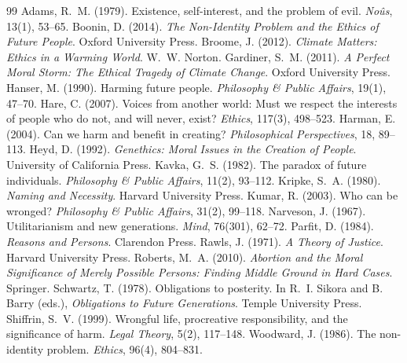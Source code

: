 \documentclass{situationist-preprint}
\begin{document}
\begin{thebibliography}{99}\small
{} Adams, R.~M. (1979). Existence, self-interest, and the problem of evil. \emph{No{\^u}s}, 13(1), 53--65.
 Boonin, D. (2014). \emph{The Non-Identity Problem and the Ethics of Future People}. Oxford University Press.
 Broome, J. (2012). \emph{Climate Matters: Ethics in a Warming World}. W.~W. Norton.
 Gardiner, S.~M. (2011). \emph{A Perfect Moral Storm: The Ethical Tragedy of Climate Change}. Oxford University Press.
 Hanser, M. (1990). Harming future people. \emph{Philosophy \& Public Affairs}, 19(1), 47--70.
 Hare, C. (2007). Voices from another world: Must we respect the interests of people who do not, and will never, exist? \emph{Ethics}, 117(3), 498--523.
 Harman, E. (2004). Can we harm and benefit in creating? \emph{Philosophical Perspectives}, 18, 89--113.
 Heyd, D. (1992). \emph{Genethics: Moral Issues in the Creation of People}. University of California Press.
 Kavka, G.~S. (1982). The paradox of future individuals. \emph{Philosophy \& Public Affairs}, 11(2), 93--112.
 Kripke, S.~A. (1980). \emph{Naming and Necessity}. Harvard University Press.
 Kumar, R. (2003). Who can be wronged? \emph{Philosophy \& Public Affairs}, 31(2), 99--118.
 Narveson, J. (1967). Utilitarianism and new generations. \emph{Mind}, 76(301), 62--72.
 Parfit, D. (1984). \emph{Reasons and Persons}. Clarendon Press.
 Rawls, J. (1971). \emph{A Theory of Justice}. Harvard University Press.
 Roberts, M.~A. (2010). \emph{Abortion and the Moral Significance of Merely Possible Persons: Finding Middle Ground in Hard Cases}. Springer.
 Schwartz, T. (1978). Obligations to posterity. In R.~I. Sikora and B. Barry (eds.), \emph{Obligations to Future Generations}. Temple University Press.
 Shiffrin, S.~V. (1999). Wrongful life, procreative responsibility, and the significance of harm. \emph{Legal Theory}, 5(2), 117--148.
 Woodward, J. (1986). The non-identity problem. \emph{Ethics}, 96(4), 804--831.
\end{thebibliography}
\end{document}

